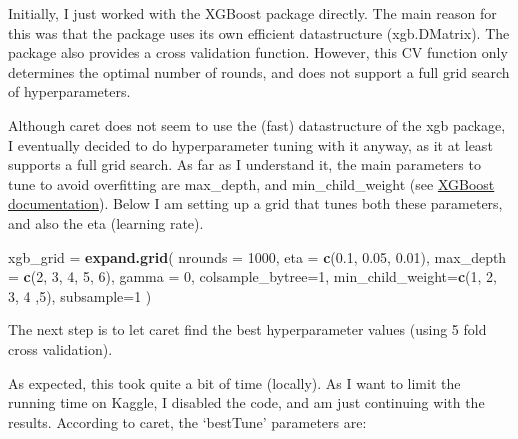 \documentclass[]{article}
\newenvironment{Shaded}{\begin{snugshade}}{\end{snugshade}}
\newcommand{\KeywordTok}[1]{\textcolor[rgb]{0.13,0.29,0.53}{\textbf{#1}}}
\newcommand{\DataTypeTok}[1]{\textcolor[rgb]{0.13,0.29,0.53}{#1}}
\newcommand{\DecValTok}[1]{\textcolor[rgb]{0.00,0.00,0.81}{#1}}
\newcommand{\FloatTok}[1]{\textcolor[rgb]{0.00,0.00,0.81}{#1}}
\newcommand{\StringTok}[1]{\textcolor[rgb]{0.31,0.60,0.02}{#1}}
\newcommand{\CommentTok}[1]{\textcolor[rgb]{0.56,0.35,0.01}{\textit{#1}}}
\newcommand{\NormalTok}[1]{#1}
\begin{document}
Initially, I just worked with the XGBoost package directly. The main
reason for this was that the package uses its own efficient
datastructure (xgb.DMatrix). The package also provides a cross
validation function. However, this CV function only determines the
optimal number of rounds, and does not support a full grid search of
hyperparameters.

Although caret does not seem to use the (fast) datastructure of the xgb
package, I eventually decided to do hyperparameter tuning with it
anyway, as it at least supports a full grid search. As far as I
understand it, the main parameters to tune to avoid overfitting are
max\_depth, and min\_child\_weight (see
\href{http://xgboost.readthedocs.io/en/latest/how_to/param_tuning.html}{XGBoost
documentation}). Below I am setting up a grid that tunes both these
parameters, and also the eta (learning rate).

\begin{Shaded}
\begin{Highlighting}[]
\NormalTok{xgb_grid =}\StringTok{ }\KeywordTok{expand.grid}\NormalTok{(}
\DataTypeTok{nrounds =} \DecValTok{1000}\NormalTok{,}
\DataTypeTok{eta =} \KeywordTok{c}\NormalTok{(}\FloatTok{0.1}\NormalTok{, }\FloatTok{0.05}\NormalTok{, }\FloatTok{0.01}\NormalTok{),}
\DataTypeTok{max_depth =} \KeywordTok{c}\NormalTok{(}\DecValTok{2}\NormalTok{, }\DecValTok{3}\NormalTok{, }\DecValTok{4}\NormalTok{, }\DecValTok{5}\NormalTok{, }\DecValTok{6}\NormalTok{),}
\DataTypeTok{gamma =} \DecValTok{0}\NormalTok{,}
\DataTypeTok{colsample_bytree=}\DecValTok{1}\NormalTok{,}
\DataTypeTok{min_child_weight=}\KeywordTok{c}\NormalTok{(}\DecValTok{1}\NormalTok{, }\DecValTok{2}\NormalTok{, }\DecValTok{3}\NormalTok{, }\DecValTok{4}\NormalTok{ ,}\DecValTok{5}\NormalTok{),}
\DataTypeTok{subsample=}\DecValTok{1}
\NormalTok{)}
\end{Highlighting}
\end{Shaded}

The next step is to let caret find the best hyperparameter values (using
5 fold cross validation).

\begin{Shaded}
\end{Shaded}

As expected, this took quite a bit of time (locally). As I want to limit
the running time on Kaggle, I disabled the code, and am just continuing
with the results. According to caret, the `bestTune' parameters are:
\end{document}
